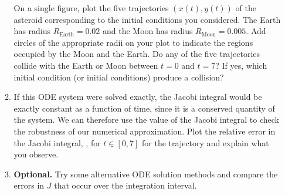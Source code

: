 \documentclass[11pt]{article}
\begin{document}
\begin{enumerate}
\begin{enumerate}
	On a single figure, plot the five trajectories $(x(t),y(t))$ of the
	asteroid corresponding to the initial conditions you considered. The
	Earth has radius $R_\text{Earth}=0.02$ and the Moon has radius
	$R_\text{Moon}=0.005$. Add circles of the appropriate radii on your
	plot to indicate the regions occupied by the Moon and the Earth. Do any
	of the five trajectories collide with the Earth or Moon between $t=0$
	and $t=7$? If yes, which initial condition (or initial conditions)
	produce a collision?
      \item If this ODE system were solved exactly, the Jacobi integral would
	be exactly constant as a function of time, since it is a conserved
	quantity of the system. We can therefore use the value of the Jacobi
	integral to check the robustness of our numerical approximation. Plot
	the relative error in the Jacobi integral, ,
	for $t \in [0,7]$ for the  trajectory and
	explain what you observe.
      \item \textbf{Optional.} Try some alternative ODE solution methods and
	compare the errors in $J$ that occur over the integration interval.
    \end{enumerate}
\end{enumerate}
\end{document}
